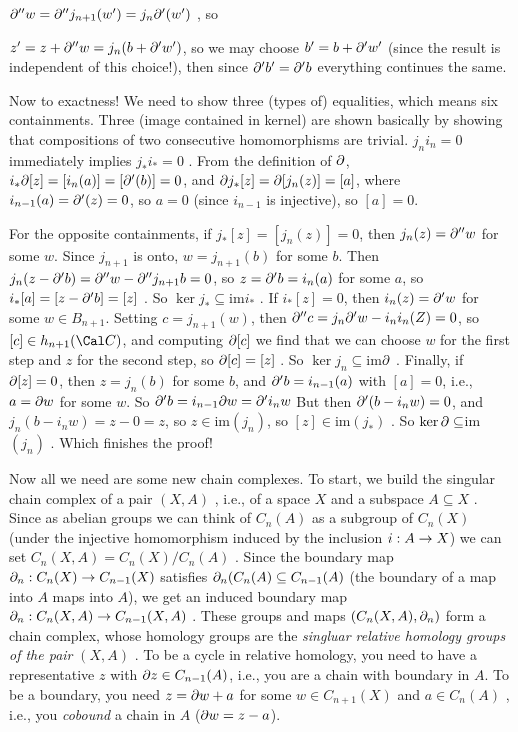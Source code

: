 $\partial^{\prime\prime}w=\partial^{\prime\prime}j_{n+1}(w^\prime) = j_n\partial^\prime(w^\prime)$ ,
so 

$z^\prime= z+\partial^{\prime\prime}w= j_n(b+\partial^\prime w^\prime)$, so we may choose
$b^\prime = b+\partial^\prime w^\prime$ (since the result is independent of this choice!),
then since $\partial^\prime b^\prime = \partial^\prime b$ everything continues the same.

\msk

Now to exactness! We need to show three (types of) equalities, which means six
containments. Three (image contained in kernel) 
are shown basically by showing that compositions of
two consecutive homomorphisms are trivial. $j_ni_n=0$ 
immediately implies $j_*i_*=0$ . From the definition of $\partial$,
$i_*\partial[z] = [i_n(a)] = [\partial^\prime(b)] = 0$, and 
$\partial j_*[z] = \partial[j_n(z)] = [a]$, where $i_{n-1}(a)=\partial^\prime(z) = 0$,
so $a=0$ (since $i_{n-1}$ is injective), so $[a]=0$. 

\ssk

For the opposite containments,
if $j_*[z]=[j_n(z)]=0$, then $j_n(z)=\partial^{\prime\prime}w$ for some $w$. 
Since $j_{n+1}$ is onto, $w=j_{n+1}(b)$ for some $b$. Then 
$j_n(z-\partial^\prime b) = \partial^{\prime\prime} w-\partial^{\prime\prime} j_{n+1} b = 0$, so 
$z=\partial^\prime b = i_n(a)$ for some $a$, so $i_*[a] = [z-\partial^\prime b] = [z]$ . 
So $\ker j_*\subseteq$im$i_*$ . If $i_*[z]=0$, then $i_n(z)=\partial^\prime w$ for some $w\in B_{n+1}$.
Setting $c=j_{n+1}(w)$, then $\partial^{\prime\prime} c = j_n \partial^\prime w - i_n i_n(Z) = 0$, so 
$[c]\in h_{n+1}({\Cal C})$, and computing $\partial [c]$ we find that we can choose $w$ for the 
first step and $z$ for the second step, so $\partial [c] = [z]$ . So $\ker j_n\subseteq$im$\partial$ .
Finally, if $\partial [z] = 0$, then $z=j_n(b)$ for some $b$, and $\partial^\prime b = i_{n-1}(a)$ with
$[a]=0$, i.e., $a=\partial w$ for some $w$. So $\partial^\prime b = i_{n-1}\partial w = \partial^\prime i_n w$ But
then $\partial^\prime (b-i_n w) = 0$, and 
$j_n(b-i_n w) = z-0 = z$, so $z\in$im$(j_n)$, so $[z]\in$im$(j_*)$ . So 
$\ker\partial\subseteq$im$(j_n)$ . Which finishes the proof!

\msk

Now all we need are some new chain complexes. To start, we build the singular chain complex
of a pair $(X,A)$ , i.e., of a space $X$ and a subspace $A\subseteq X$ .
Since as abelian groups we can think of 
$C_n(A)$ as a subgroup of $C_n(X)$ (under the injective homomorphism induced by the 
inclusion $i:A\rightarrow X$) we can set $C_n(X,A)= C_n(X)/C_n(A)$ . Since the
boundary map $\partial_n:C_n(X)\rightarrow C_{n-1}(X)$ satisfies
$\partial_n(C_n(A)\subseteq C_{n-1}(A)$ (the boundary of a map into $A$ maps into $A$),
we get an induced boundary map $\partial_n:C_n(X,A)\rightarrow C_{n-1}(X,A)$ . These
groups and maps $(C_n(X,A),\partial_n)$ form a chain complex, whose homology groups 
are the {\it singluar relative homology groups of the pair} $(X,A)$ . To be a cycle
in relative homology, you need to have a representative $z$ with $\partial z\in C_{n-1}(A)$,
i.e., you are a chain with boundary in $A$. To be a boundary, you need
$z=\partial w +a$ for some $w\in C_{n+1}(X)$ and $a\in C_n(A)$ , i.e., you {\it cobound}
a chain in $A$ ($\partial w = z-a$).

